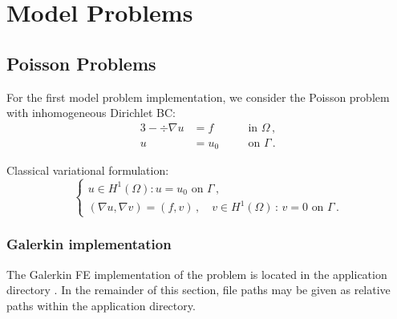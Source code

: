 %
%

\chapter{Model Problems}
\label{chap:examples}


\section{Poisson Problems}
\label{sec:poisson}

For the first model problem implementation, we consider the Poisson problem with inhomogeneous Dirichlet BC:
\begin{alignat*}{3}
	- \div \nabla u &= f && \quad \text{in } \Omega \, , \\
	u &= u_0 && \quad \text{on } \Gamma \, .
\end{alignat*}

Classical variational formulation:
\[
\left\{
\begin{array}{llll}
	u \in H^1(\Omega):  u = u_0 \text{ on } \Gamma \, , \\[5pt]
	(\nabla u, \nabla v) = (f,v) \, ,
	\quad v \in H^1(\Omega) \, : \, v = 0 \text{ on } \Gamma \, .
\end{array}
\right.
\]

\subsection{Galerkin implementation}
\label{subsec:poisson-galerkin}

The Galerkin FE implementation of the problem is located in the application directory . In the remainder of this section, file paths may be given as relative paths within the application directory.

